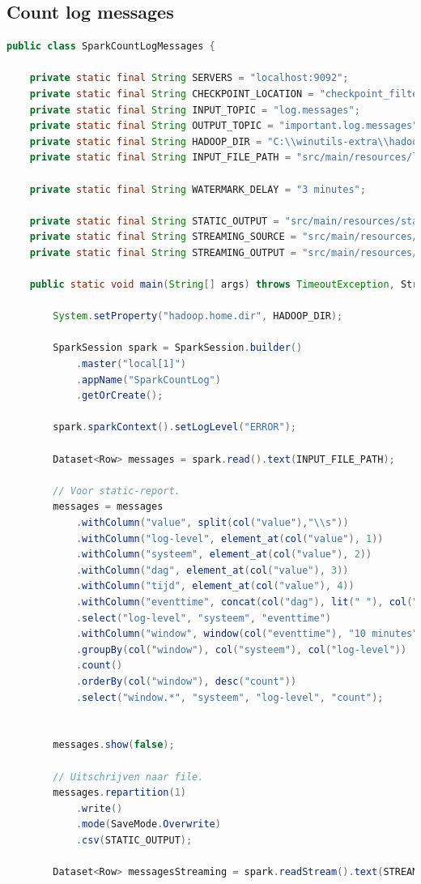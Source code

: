 \documentclass[a4paper,10pt,twoside]{report}
\begin{document}
\subsection{Count log messages}
\begin{lstlisting}[language=Java]
public class SparkCountLogMessages {
	
	private static final String SERVERS = "localhost:9092";
	private static final String CHECKPOINT_LOCATION = "checkpoint_filterlogs";
	private static final String INPUT_TOPIC = "log.messages";
	private static final String OUTPUT_TOPIC = "important.log.messages";
	private static final String HADOOP_DIR = "C:\\winutils-extra\\hadoop";
	private static final String INPUT_FILE_PATH = "src/main/resources/log.messages.delayed.txt";
	
	private static final String WATERMARK_DELAY = "3 minutes";
	
	private static final String STATIC_OUTPUT = "src/main/resources/static-report";
	private static final String STREAMING_SOURCE = "src/main/resources/streaming-source";
	private static final String STREAMING_OUTPUT = "src/main/resources/streaming-report";
	
	public static void main(String[] args) throws TimeoutException, StreamingQueryException {
		
		System.setProperty("hadoop.home.dir", HADOOP_DIR);
		
		SparkSession spark = SparkSession.builder()
			.master("local[1]")
			.appName("SparkCountLog")
			.getOrCreate();
		
		spark.sparkContext().setLogLevel("ERROR");
		
		Dataset<Row> messages = spark.read().text(INPUT_FILE_PATH);
		
		// Voor static-report.
		messages = messages
			.withColumn("value", split(col("value"),"\\s"))
			.withColumn("log-level", element_at(col("value"), 1))
			.withColumn("systeem", element_at(col("value"), 2))
			.withColumn("dag", element_at(col("value"), 3))
			.withColumn("tijd", element_at(col("value"), 4))
			.withColumn("eventtime", concat(col("dag"), lit(" "), col("tijd")))
			.select("log-level", "systeem", "eventtime")
			.withColumn("window", window(col("eventtime"), "10 minutes", "5 minutes"))
			.groupBy(col("window"), col("systeem"), col("log-level"))
			.count()
			.orderBy(col("window"), desc("count"))
			.select("window.*", "systeem", "log-level", "count");
		
		
		messages.show(false);
		
		// Uitschrijven naar file.
		messages.repartition(1)
			.write()
			.mode(SaveMode.Overwrite)
			.csv(STATIC_OUTPUT);
			
		Dataset<Row> messagesStreaming = spark.readStream().text(STREAMING_SOURCE);
\end{lstlisting}
\end{document}
